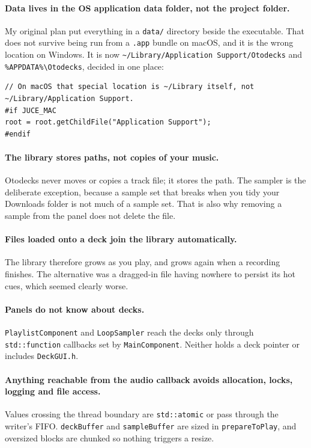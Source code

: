 \documentclass[11pt,a4paper]{article}
\newcommand{\code}[1]{\texttt{#1}}
\begin{document}
\paragraph{Data lives in the OS application data folder, not the project folder.}
My original plan put everything in a \code{data/} directory beside the executable.
That does not survive being run from a \code{.app} bundle on macOS, and it is the
wrong location on Windows. It is now
\code{\textasciitilde/Library/Application Support/Otodecks} and
\code{\%APPDATA\%\textbackslash Otodecks}, decided in one place:

\begin{lstlisting}
// On macOS that special location is ~/Library itself, not ~/Library/Application Support.
#if JUCE_MAC
root = root.getChildFile("Application Support");
#endif
\end{lstlisting}

\paragraph{The library stores paths, not copies of your music.} Otodecks never
moves or copies a track file; it stores the path. The sampler is the deliberate
exception, because a sample set that breaks when you tidy your Downloads folder is
not much of a sample set. That is also why removing a sample from the panel does
not delete the file.

\paragraph{Files loaded onto a deck join the library automatically.} The library
therefore grows as you play, and grows again when a recording finishes. The alternative was a dragged-in file
having nowhere to persist its hot cues, which seemed clearly worse.

\paragraph{Panels do not know about decks.} \code{PlaylistComponent} and
\code{LoopSampler} reach the decks only through \code{std::function} callbacks set
by \code{MainComponent}. Neither holds a deck pointer or includes
\code{DeckGUI.h}.

\paragraph{Anything reachable from the audio callback avoids allocation, locks,
logging and file access.} Values crossing the thread boundary are
\code{std::atomic} or pass through the writer's FIFO. \code{deckBuffer} and
\code{sampleBuffer} are sized in \code{prepareToPlay}, and oversized blocks are
chunked so nothing triggers a resize.
\end{document}
